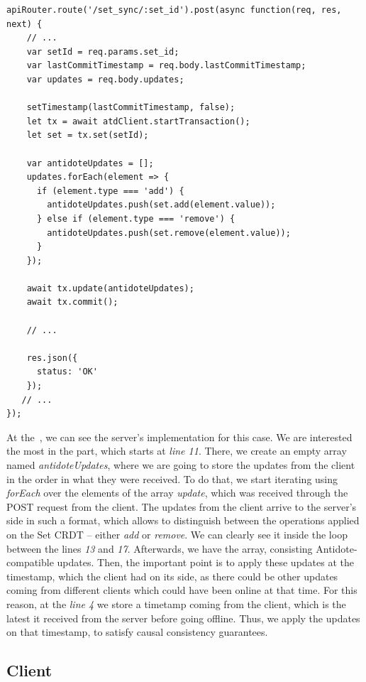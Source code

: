 \begin{lstlisting}[caption={Code for applying an \textit{add} operation to a Set CRDT.}, label={lst:dev3}]
apiRouter.route('/set_sync/:set_id').post(async function(req, res, next) {
    // ...
    var setId = req.params.set_id;
    var lastCommitTimestamp = req.body.lastCommitTimestamp;
    var updates = req.body.updates;

    setTimestamp(lastCommitTimestamp, false);
    let tx = await atdClient.startTransaction();
    let set = tx.set(setId);

    var antidoteUpdates = [];
    updates.forEach(element => {
      if (element.type === 'add') {
        antidoteUpdates.push(set.add(element.value));
      } else if (element.type === 'remove') {
        antidoteUpdates.push(set.remove(element.value));
      }
    });

    await tx.update(antidoteUpdates);
    await tx.commit();
    
    // ...

    res.json({
      status: 'OK'
    });
   // ...
});
\end{lstlisting}

At the~, we can see the server's implementation for this case. We are interested the most in the part, which starts at \textit{line 11}. There, we create an empty array named \textit{antidoteUpdates}, where we are going to store the updates from the client in the order in what they were received. To do that, we start iterating using \textit{forEach} over the elements of the array \textit{update}, which was received through the POST request from the client. The updates from the client arrive to the server's side in such a format, which allows to distinguish between the operations applied on the Set CRDT -- either \textit{add} or \textit{remove}. We can clearly see it inside the loop between the lines \textit{13} and \textit{17}. Afterwards, we have the array, consisting Antidote-compatible updates. Then, the important  point is to apply these updates at the timestamp, which the client had on its side, as there could be other updates coming from different clients which could have been online at that time. For this reason, at the \textit{line 4} we store a timetamp coming from the client, which is the latest it received from the server before going offline. Thus, we apply the updates on that timestamp, to satisfy causal consistency guarantees.

\subsection{Client}

